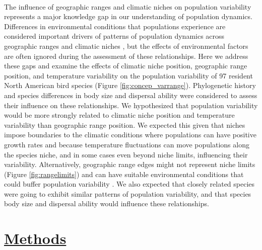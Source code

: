 \paragraph*{}
The influence of geographic ranges and climatic niches on population variability represents a major knowledge gap in our understanding of population dynamics. Differences in environmental conditions that populations experience are considered important drivers of patterns of population dynamics across geographic ranges and climatic niches \parencite{sagarin2006,pironon2017, tencaten2025}, but the effects of environmental factors are often ignored during the assessment of these relationships. Here we address these gaps and examine the effects of climatic niche position, geographic range position, and temperature variability on the population variability of 97 resident North American bird species (Figure \ref{fig:concep_varrange}). Phylogenetic history and species differences in body size and dispersal ability were considered to assess their influence on these relationships. We hypothesized that population variability would be more strongly related to climatic niche position and temperature variability than geographic range position. We expected this given that niches impose boundaries to the climatic conditions where populations can have positive growth rates and because temperature fluctuations can move populations along the species niche, and in some cases even beyond niche limits, influencing their variability. Alternatively, geographic range edges might not represent niche limits (Figure \ref{fig:rangelimits}) and can have suitable environmental conditions that could buffer population variability \parencite{oldfather2018}. We also expected that closely related species were going to exhibit similar patterns of population variability, and that species body size and dispersal ability would influence these relationships.  
 
\section*{\textbf{\underline{Methods}}}
